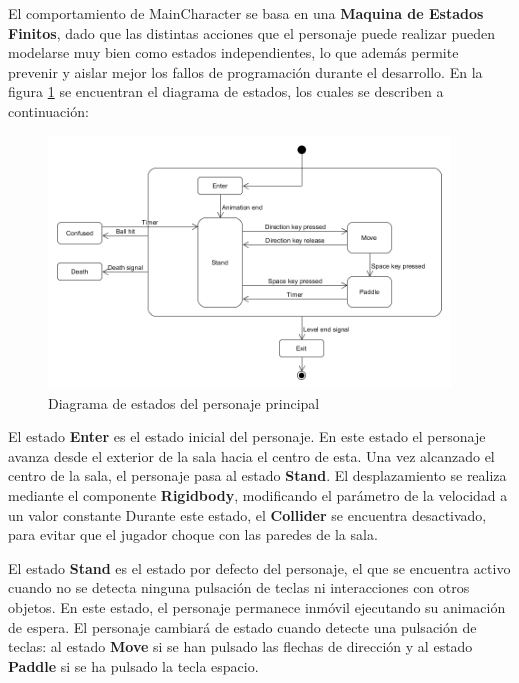 El comportamiento de MainCharacter se basa en una \textbf{Maquina de Estados Finitos}, dado que las distintas acciones que el personaje puede realizar pueden modelarse muy bien como estados independientes, lo que además permite prevenir y aislar mejor los fallos de programación durante el desarrollo. En la figura \ref{player_states} se encuentran el diagrama de estados, los cuales se describen a continuación:
\begin{figure}[h]
	\includegraphics[width=0.95\textwidth]{images/estructura/personaje/main_character_states}
	\centering
	\caption{Diagrama de estados del personaje principal}
	\label{player_states}
\end{figure}

El estado \textbf{Enter} es el estado inicial del personaje. En este estado el personaje avanza desde el exterior de la sala hacia el centro de esta. Una vez alcanzado el centro de la sala, el personaje pasa al estado \textbf{Stand}. El desplazamiento se realiza mediante el componente \textbf{Rigidbody}, modificando el parámetro de la velocidad a un valor constante Durante este estado, el \textbf{Collider} se encuentra desactivado, para evitar que el jugador choque con las paredes de la sala.

El estado \textbf{Stand} es el estado por defecto del personaje, el que se encuentra activo cuando no se detecta ninguna pulsación de teclas ni interacciones con otros objetos. En este estado, el personaje permanece inmóvil ejecutando su animación de espera. El personaje cambiará de estado cuando detecte una pulsación de teclas: al estado \textbf{Move} si se han pulsado las flechas de dirección y al estado \textbf{Paddle} si se ha pulsado la tecla espacio.


